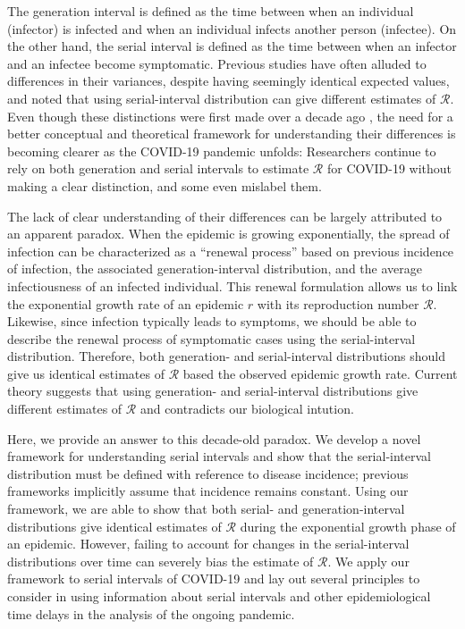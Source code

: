 \documentclass[12pt]{article}
\begin{document}
The generation interval is defined as the time between when an individual (infector) is infected and when an individual infects another person (infectee).
On the other hand, the serial interval is defined as the time between when an infector and an infectee become symptomatic.
Previous studies have often alluded to differences in their variances, despite having seemingly identical expected values, and noted that using serial-interval distribution can give different estimates of $\mathcal R$.
Even though these distinctions were first made over a decade ago \citep{svensson2007note}, 
the need for a better conceptual and theoretical framework for understanding their differences is becoming clearer as the COVID-19 pandemic unfolds:
Researchers continue to rely on both generation and serial intervals to estimate $\mathcal R$ for COVID-19 without making a clear distinction, and some even mislabel them.

The lack of clear understanding of their differences can be largely attributed to an apparent paradox.
When the epidemic is growing exponentially, the spread of infection can be characterized as a ``renewal process'' based on previous incidence of infection, the associated generation-interval distribution, and the average infectiousness of an infected individual.
This renewal formulation allows us to link the exponential growth rate of an epidemic $r$ with its reproduction number $\mathcal R$.
Likewise, since infection typically leads to symptoms, we should be able to describe the renewal process of symptomatic cases using the serial-interval distribution.
Therefore, both generation- and serial-interval distributions should give us identical estimates of  $\mathcal R$ based the observed epidemic growth rate.
Current theory suggests that using generation- and serial-interval distributions give different estimates of $\mathcal R$ and contradicts our biological intution.

Here, we provide an answer to this decade-old paradox.
We develop a novel framework for understanding serial intervals and show that the serial-interval distribution must be defined with reference to disease incidence;
previous frameworks implicitly assume that incidence remains constant.
Using our framework, we are able to show that both serial- and generation-interval distributions give identical estimates of $\mathcal R$ during the exponential growth phase of an epidemic.
However, failing to account for changes in the serial-interval distributions over time can severely bias the estimate of $\mathcal R$.
We apply our framework to serial intervals of COVID-19 and lay out several principles to consider in using information about serial intervals and other epidemiological time delays in the analysis of the ongoing pandemic.
\end{document}
